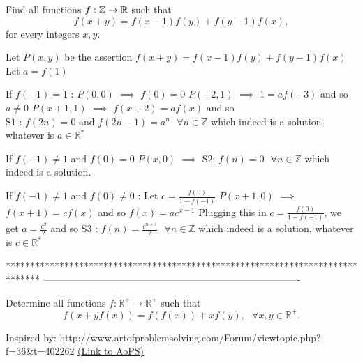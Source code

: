 \begin{solution}
	\begin{tcolorbox}Find all functions $f : \Bbb{Z}\to \Bbb{R}$  such that \[f(x+y) = f(x-1)f(y) + f(y-1)f(x),\] for every integers $x, y.$\end{tcolorbox}
Let $P(x,y)$ be the assertion $f(x+y)=f(x-1)f(y)+f(y-1)f(x)$
Let $a=f(1)$

If $f(-1)=1$ :
$P(0,0)$ $\implies$ $f(0)=0$
$P(-2,1)$ $\implies$ $1=af(-3)$ and so $a\ne 0$
$P(x+1,1)$ $\implies$ $f(x+2)=af(x)$ and so $\boxed{\text{S1 : }f(2n)=0\text{  and  }f(2n-1)=a^n\text{  }\forall n\in\mathbb Z}$ which indeed is a solution, whatever is $a\in\mathbb R^*$

If $f(-1)\ne 1$ and $f(0)=0$
$P(x,0)$ $\implies$ $\boxed{\text{S2: }f(n)=0\text{  }\forall n\in\mathbb Z}$ which indeed is a solution.

If $f(-1)\ne 1$ and $f(0)\ne 0$ :
Let $c=\frac{f(0)}{1-f(-1)}$ 
$P(x+1,0)$ $\implies$ $f(x+1)=cf(x)$ and so $f(x)=ac^{x-1}$
Plugging this in $c=\frac{f(0)}{1-f(-1)}$, we get $a=\frac {c^2}2$ and so $\boxed{\text{S3 : }f(n)=\frac{c^{n+1}}2\text{  }\forall n\in\mathbb Z}$ which indeed is a solution, whatever is $c\in\mathbb R^*$
\end{solution}
*******************************************************************************
-------------------------------------------------------------------------------

\begin{problem}
	Determine all functions $f : \mathbb{R}^+ \to \mathbb{R}^+$ such that \[   f(x+yf(x))=f(f(x))+xf(y)   , \ \ \  \forall x,y \in \mathbb{R}^+.\]

Inspired by:  http://www.artofproblemsolving.com/Forum/viewtopic.php?f=36&t=402262
	\flushright \href{https://artofproblemsolving.com/community/c6h616020}{(Link to AoPS)}
\end{problem}



